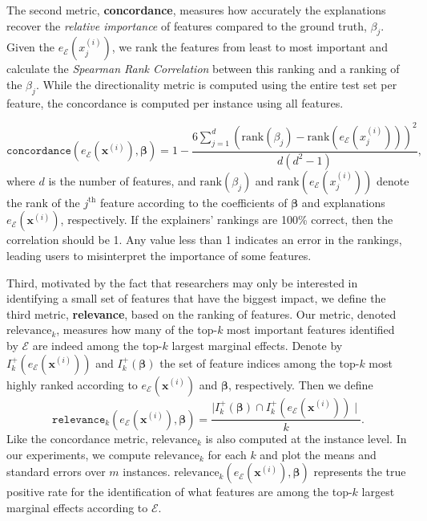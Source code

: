\documentclass[mnsc,blindrev]{informs3}
\newcommand{\mE}{\mathcal{E}}
\begin{document}
      The second metric, \textbf{concordance}, measures how accurately the explanations recover the \textit{relative importance} of features compared to the ground truth, $\beta_j$. Given the $e_\mathcal{E}(x^{(i)}_j)$, we rank the features from least to most important and calculate the \emph{Spearman Rank Correlation} \cite{spearman1904proof} between this ranking and a ranking of the $\beta_j$. While the directionality metric is computed using the entire test set per feature, the concordance is computed per instance using all features.

    \begin{equation}
       \texttt{concordance}(e_\mE(\mathbf{x}^{(i)}),\boldsymbol{\beta}) = 1 - \frac{6\sum_{j=1}^d (\text{rank}(\beta_j) - \text{rank}(e_\mE(x^{(i)}_j)))^2}{d(d^2-1)},
    \end{equation}
    where $d$ is the number of features, and $\text{rank}(\beta_j)$ and $\text{rank}(e_\mE(x^{(i)}_j))$ denote the rank of the $j^{\text{th}}$ feature according to the coefficients of $\boldsymbol{\beta}$ and explanations $e_\mE(\mathbf{x}^{(i)})$, respectively. If the explainers' rankings are 100\% correct, then the correlation should be 1. Any value less than 1 indicates an error in the rankings, leading users to misinterpret the importance of some features.
    
Third, motivated by the fact that  researchers may only be  interested in identifying a small set of features that have the biggest impact, we define the third metric, \textbf{relevance}, based on the ranking of features. Our metric, denoted $\text{relevance}_k$, measures how many of the top-$k$ most important features identified by $\mathcal{E}$ are indeed among the top-$k$ largest marginal effects. Denote by $I_k^+(e_\mE(\mathbf{x}^{(i)}))$ and $I_k^+(\boldsymbol{\beta})$  the set of feature indices  among the top-$k$ most highly ranked according to $e_\mE(\mathbf{x}^{(i)})$ and $\boldsymbol{\beta}$, respectively. Then we define 
    \begin{equation}
        \texttt{relevance}_k(e_\mE(\mathbf{x}^{(i)}), \boldsymbol{\beta}) = \frac{\mid I_k^+(\boldsymbol{\beta}) \cap I_k^+(e_\mE(\mathbf{x}^{(i)}))\mid}{k}.
    \end{equation}
     Like the concordance metric, $\text{relevance}_k$ is also computed at the instance level. 
    In our experiments, we compute $\text{relevance}_k$ for each $k$ and plot the means and standard errors over $m$ instances. $\text{relevance}_k(e_\mE(\mathbf{x}^{(i)}), \boldsymbol{\beta})$ represents the true positive rate for the identification of what features are among the top-$k$ largest marginal effects according to $\mathcal{E}$.       
    
\end{document}
